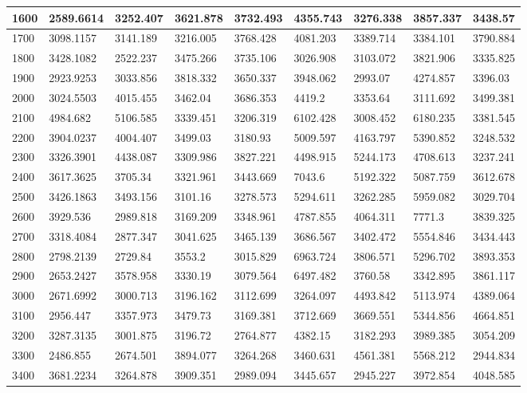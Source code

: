 \begin{table}[]
{\begin{tabular}{|l|l|l|l|l|l|l|l|l|}
1600 & 2589.6614 & 3252.407 & 3621.878 & 3732.493 & 4355.743 & 3276.338 & 3857.337 & 3438.57 \\ \hline
1700 & 3098.1157 & 3141.189 & 3216.005 & 3768.428 & 4081.203 & 3389.714 & 3384.101 & 3790.884 \\ \hline
1800 & 3428.1082 & 2522.237 & 3475.266 & 3735.106 & 3026.908 & 3103.072 & 3821.906 & 3335.825 \\ \hline
1900 & 2923.9253 & 3033.856 & 3818.332 & 3650.337 & 3948.062 & 2993.07 & 4274.857 & 3396.03 \\ \hline
2000 & 3024.5503 & 4015.455 & 3462.04 & 3686.353 & 4419.2 & 3353.64 & 3111.692 & 3499.381 \\ \hline
2100 & 4984.682 & 5106.585 & 3339.451 & 3206.319 & 6102.428 & 3008.452 & 6180.235 & 3381.545 \\ \hline
2200 & 3904.0237 & 4004.407 & 3499.03 & 3180.93 & 5009.597 & 4163.797 & 5390.852 & 3248.532 \\ \hline
2300 & 3326.3901 & 4438.087 & 3309.986 & 3827.221 & 4498.915 & 5244.173 & 4708.613 & 3237.241 \\ \hline
2400 & 3617.3625 & 3705.34 & 3321.961 & 3443.669 & 7043.6 & 5192.322 & 5087.759 & 3612.678 \\ \hline
2500 & 3426.1863 & 3493.156 & 3101.16 & 3278.573 & 5294.611 & 3262.285 & 5959.082 & 3029.704 \\ \hline
2600 & 3929.536 & 2989.818 & 3169.209 & 3348.961 & 4787.855 & 4064.311 & 7771.3 & 3839.325 \\ \hline
2700 & 3318.4084 & 2877.347 & 3041.625 & 3465.139 & 3686.567 & 3402.472 & 5554.846 & 3434.443 \\ \hline
2800 & 2798.2139 & 2729.84 & 3553.2 & 3015.829 & 6963.724 & 3806.571 & 5296.702 & 3893.353 \\ \hline
2900 & 2653.2427 & 3578.958 & 3330.19 & 3079.564 & 6497.482 & 3760.58 & 3342.895 & 3861.117 \\ \hline
3000 & 2671.6992 & 3000.713 & 3196.162 & 3112.699 & 3264.097 & 4493.842 & 5113.974 & 4389.064 \\ \hline
3100 & 2956.447 & 3357.973 & 3479.73 & 3169.381 & 3712.669 & 3669.551 & 5344.856 & 4664.851 \\ \hline
3200 & 3287.3135 & 3001.875 & 3196.72 & 2764.877 & 4382.15 & 3182.293 & 3989.385 & 3054.209 \\ \hline
3300 & 2486.855 & 2674.501 & 3894.077 & 3264.268 & 3460.631 & 4561.381 & 5568.212 & 2944.834 \\ \hline
3400 & 3681.2234 & 3264.878 & 3909.351 & 2989.094 & 3445.657 & 2945.227 & 3972.854 & 4048.585 \\ \hline

\end{tabular}}
\end{table}
